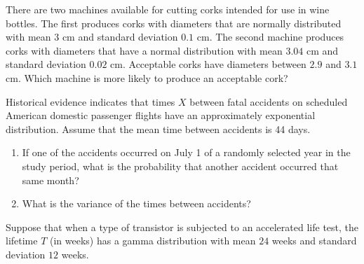 \documentclass[12pt,reqno]{amsart}
\begin{document}
\bigskip
\prob There are two machines available for cutting corks intended for use in wine bottles. The first produces corks with diameters that are normally distributed with mean $3$ cm and standard deviation $0.1$ cm. The second machine produces corks with diameters that have a normal distribution with mean $3.04$ cm and standard deviation $0.02$ cm. Acceptable corks have diameters between $2.9$ and $3.1$ cm. Which machine is more likely to produce an acceptable cork?\vfill












\newpage
\prob Historical evidence indicates that times $X$ between fatal accidents on scheduled American domestic passenger flights have an approximately exponential distribution. Assume that the mean time between accidents is 44 days.

\medskip
\begin{enumerate}
\item If one of the accidents occurred on July 1 of a randomly selected year in the study period, what is the probability that another accident occurred that same month?\vfill



\item What is the variance of the times between accidents?\vfill


\end{enumerate}













\bigskip
\prob Suppose that when a type of transistor is subjected to an accelerated life test, the lifetime $T$ (in weeks) has a gamma distribution with mean $24$ weeks and standard deviation $12$ weeks.
\end{document}
